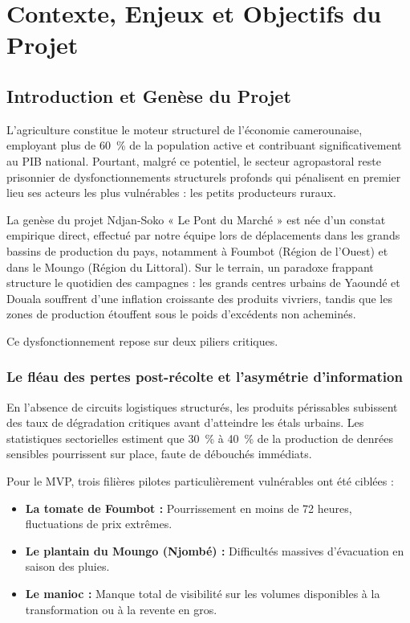 \documentclass[12pt,a4paper]{report}
\begin{document}
\section{Contexte, Enjeux et Objectifs du Projet}

\subsection{Introduction et Genèse du Projet}

L'agriculture constitue le moteur structurel de l'économie camerounaise, employant plus de 60~\% de la population active et contribuant significativement au PIB national. Pourtant, malgré ce potentiel, le secteur agropastoral reste prisonnier de dysfonctionnements structurels profonds qui pénalisent en premier lieu ses acteurs les plus vulnérables : les petits producteurs ruraux.

La genèse du projet Ndjan-Soko « Le Pont du Marché » est née d'un constat empirique direct, effectué par notre équipe lors de déplacements dans les grands bassins de production du pays, notamment à Foumbot (Région de l'Ouest) et dans le Moungo (Région du Littoral). Sur le terrain, un paradoxe frappant structure le quotidien des campagnes : les grands centres urbains de Yaoundé et Douala souffrent d'une inflation croissante des produits vivriers, tandis que les zones de production étouffent sous le poids d'excédents non acheminés.

Ce dysfonctionnement repose sur deux piliers critiques.

\subsubsection{Le fléau des pertes post-récolte et l'asymétrie d'information}

En l'absence de circuits logistiques structurés, les produits périssables subissent des taux de dégradation critiques avant d'atteindre les étals urbains. Les statistiques sectorielles estiment que 30~\% à 40~\% de la production de denrées sensibles pourrissent sur place, faute de débouchés immédiats.

Pour le MVP, trois filières pilotes particulièrement vulnérables ont été ciblées :

\begin{itemize}
  \item \textbf{La tomate de Foumbot :} Pourrissement en moins de 72 heures, fluctuations de prix extrêmes.
  \item \textbf{Le plantain du Moungo (Njombé) :} Difficultés massives d'évacuation en saison des pluies.
  \item \textbf{Le manioc :} Manque total de visibilité sur les volumes disponibles à la transformation ou à la revente en gros.
\end{itemize}
\end{document}

